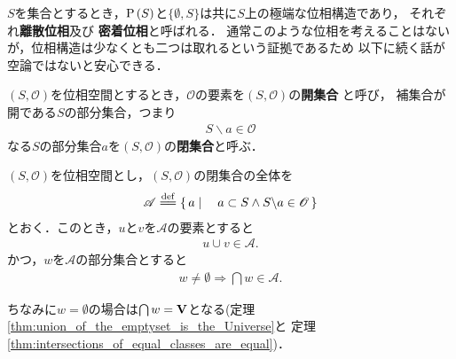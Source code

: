 	$S$を集合とするとき，$\operatorname*{P} \left(S\right)$と$\{\emptyset,S\}$は共に$S$上の極端な位相構造であり，
	それぞれ{\bf 離散位相}及び
	{\bf 密着位相}と呼ばれる．
	通常このような位相を考えることはないが，位相構造は少なくとも二つは取れるという証拠であるため
	以下に続く話が空論ではないと安心できる．
	
	\begin{screen}
		\begin{dfn}[開集合と閉集合]
			$(S,\mathscr{O})$を位相空間とするとき，$\mathscr{O}$の要素を$(S,\mathscr{O})$の{\bf 開集合}
			と呼び，
			補集合が開である$S$の部分集合，つまり
			\begin{align}
				S \backslash a \in \mathscr{O}
			\end{align}
			なる$S$の部分集合$a$を$(S,\mathscr{O})$の{\bf 閉集合}と呼ぶ．
		\end{dfn}
	\end{screen}
	
	\begin{screen}
		\begin{thm}[閉集合の全体は要素の対の合併と空でない部分集合の交叉で閉じる]
		\label{thm:union_of_two_closed_sets_is_closed_and_intersection_of_closed_sets_is_closed}
			$(S,\mathscr{O})$を位相空間とし，$(S,\mathscr{O})$の閉集合の全体を
			\begin{align}
				\mathscr{A} \defeq \Set{a}{a \subset S \wedge S \backslash a \in \mathscr{O}}
			\end{align}
			とおく．このとき，$u$と$v$を$\mathscr{A}$の要素とすると
			\begin{align}
				u \cup v \in \mathscr{A}.
			\end{align}
			かつ，$w$を$\mathscr{A}$の部分集合とすると
			\begin{align}
				w \neq \emptyset \Longrightarrow \bigcap w \in \mathscr{A}.
			\end{align}
		\end{thm}
	\end{screen}
	
	ちなみに$w = \emptyset$の場合は$\bigcap w = \mathbf{V}$となる(定理\ref{thm:union_of_the_emptyset_is_the_Universe}と
	定理\ref{thm:intersections_of_equal_classes_are_equal})．
	
